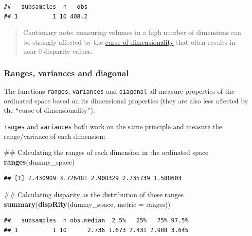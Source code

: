 \documentclass[]{book}
\newenvironment{Shaded}{\begin{snugshade}}{\end{snugshade}}
\newcommand{\KeywordTok}[1]{\textcolor[rgb]{0.13,0.29,0.53}{\textbf{#1}}}
\newcommand{\DataTypeTok}[1]{\textcolor[rgb]{0.13,0.29,0.53}{#1}}
\newcommand{\NormalTok}[1]{#1}
\theoremstyle{definition}
\theoremstyle{definition}
\theoremstyle{remark}
\begin{document}
\begin{verbatim}
##   subsamples  n   obs
## 1          1 10 408.2
\end{verbatim}

\begin{quote}
Cautionary note: measuring volumes in a high number of dimensions can be
strongly affected by the
\href{https://en.wikipedia.org/wiki/Curse_of_dimensionality}{curse of
dimensionality} that often results in near 0 disparity values.
\end{quote}

\subsubsection{Ranges, variances and
diagonal}\label{ranges-variances-and-diagonal}

The functions \texttt{ranges}, \texttt{variances} and \texttt{diagonal}
all measure properties of the ordinated space based on its dimensional
properties (they are also less affected by the ``curse of
dimensionality''):

\texttt{ranges} and \texttt{variances} both work on the same principle
and measure the range/variance of each dimension:

\begin{Shaded}
\begin{Highlighting}[]
\NormalTok{## Calculating the ranges of each dimension in the ordinated space}
\KeywordTok{ranges}\NormalTok{(dummy_space)}
\end{Highlighting}
\end{Shaded}

\begin{verbatim}
## [1] 2.430909 3.726481 2.908329 2.735739 1.588603
\end{verbatim}

\begin{Shaded}
\begin{Highlighting}[]
\NormalTok{## Calculating disparity as the distribution of these ranges}
\KeywordTok{summary}\NormalTok{(}\KeywordTok{dispRity}\NormalTok{(dummy_space, }\DataTypeTok{metric =}\NormalTok{ ranges))}
\end{Highlighting}
\end{Shaded}

\begin{verbatim}
##   subsamples  n obs.median  2.5%   25%   75% 97.5%
## 1          1 10      2.736 1.673 2.431 2.908 3.645
\end{verbatim}
\end{document}
